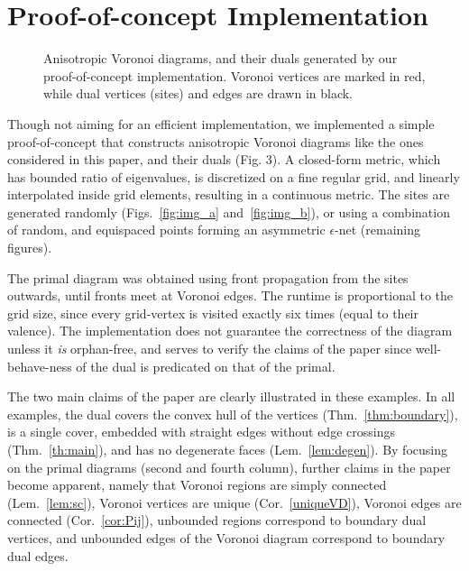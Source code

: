 \documentclass[11pt]{article}
\begin{document}
\section{Proof-of-concept Implementation}\label{sec:implementation}

\begin{figure}[ht]
\centering
{}
\quad
{}
\caption{
Anisotropic Voronoi diagrams, and their duals generated by our
proof-of-concept implementation. 
Voronoi vertices are marked in red, while dual vertices (sites) and edges are drawn
in black.}
\end{figure}



Though not aiming for an efficient implementation, 
we implemented a simple proof-of-concept that constructs anisotropic Voronoi diagrams
like the ones considered in this paper, and their duals
(Fig. 3). 
A closed-form metric, which has bounded ratio of eigenvalues, is discretized on a
fine regular grid, and linearly interpolated inside grid elements, resulting in a
continuous metric. The sites are generated randomly (Figs.~\ref{fig:img_a}
and~\ref{fig:img_b}), or using a combination of random, and equispaced
points forming an asymmetric $\epsilon$-net (remaining figures). 

The primal diagram was obtained using front propagation from the sites
outwards, until fronts meet at Voronoi edges. 
The runtime is proportional to the grid size, since every grid-vertex is visited exactly six times (equal to their valence). 
The implementation does not guarantee the correctness of the diagram unless it \emph{is} orphan-free, and serves to verify the claims of the paper since well-behave-ness of the dual is predicated on that of the primal. 


The two main claims of the paper are clearly illustrated in these examples. 
In all examples, the dual covers the convex hull of the vertices
(Thm.~\ref{thm:boundary}), is a
single cover, embedded with straight edges without edge crossings
(Thm.~\ref{th:main}), 
and has no degenerate faces (Lem.~\ref{lem:degen}). 
By focusing on the primal diagrams (second and fourth column), further claims in
the paper become apparent, namely that Voronoi regions are simply connected (Lem.~\ref{lem:sc}), 
Voronoi vertices are unique (Cor.~\ref{uniqueVD}), 
Voronoi edges are connected (Cor.~\ref{cor:Pij}), 
unbounded regions correspond to boundary dual vertices, and unbounded
edges of the Voronoi diagram correspond to boundary dual edges.
\end{document}
